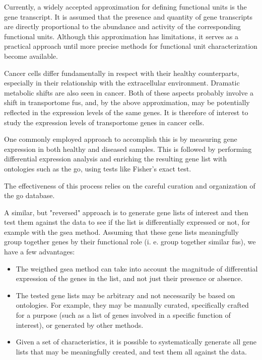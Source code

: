 Currently, a widely accepted approximation for defining functional units is the gene transcript.
It is assumed that the presence and quantity of gene transcripts are directly proportional to the abundance and activity of the corresponding functional units.
Although this approximation has limitations, it serves as a practical approach until more precise methods for functional unit characterization become available.

Cancer cells differ fundamentally in respect with their healthy counterparts, especially in their relationship with the extracellular environment.
Dramatic metabolic shifts are also seen in cancer.
Both of these aspects probably involve a shift in transportome \glspl{fu}, and, by the above approximation, may be potentially reflected in the expression levels of the same genes.
It is therefore of interest to study the expression levels of transportome genes in cancer cells.

One commonly employed approach to accomplish this is by measuring gene expression in both healthy and diseased samples.
This is followed by performing differential expression analysis and enriching the resulting gene list with ontologies such as the \gls{go}, using tests like Fisher's exact test.

The effectiveness of this process relies on the careful curation and organization of the \gls{go} database.

A similar, but "reversed" approach is to generate gene lists of interest and then test them against the data to see if the list is differentially expressed or not, for example with the \gls{gsea} method.
Assuming that these gene lists meaningfully group together genes by their functional role (i. e. group together similar \glspl{fu}), we have a few advantages:
\begin{itemize}
    \item The weigthed \gls{gsea} method can take into account the magnitude of differential expression of the genes in the list, and not just their presence or absence.
    \item The tested gene lists may be arbitrary and not necessarily be based on ontologies. For example, they may be manually curated, specifically crafted for a purpose (such as a list of genes involved in a specific function of interest), or generated by other methods.
    \item Given a set of characteristics, it is possible to systematically generate all gene lists that may be meaningfully created, and test them all against the data.
\end{itemize}

